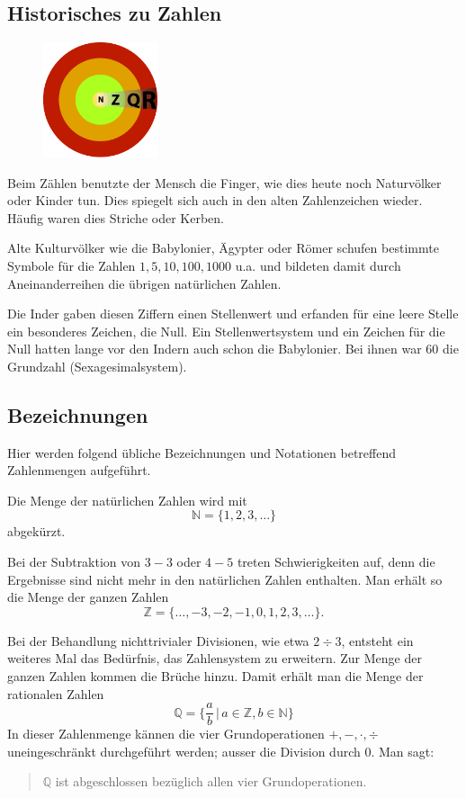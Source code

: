 \documentclass[%
11pt,%
twoside,%
titlepage,%
swissgerman,%
headsepline%
]{scrartcl}
\newcommand{\definition}[1]{\colorbox{emerald}{#1}}
\theoremstyle{definition}
\theoremstyle{plain}
\begin{document}
\subsection{Historisches zu Zahlen}

\begin{figure}
  \begin{center}
    \includegraphics[width=0.3\textwidth]{pictures/zahlen}
  \end{center}
\end{figure}
Beim Zählen benutzte der Mensch die Finger, wie dies heute noch Naturvölker oder Kinder tun. Dies spiegelt sich auch in den alten Zahlenzeichen wieder. Häufig waren dies Striche oder Kerben.

Alte Kulturvölker wie die Babylonier, Ägypter oder Römer schufen bestimmte Symbole für die Zahlen $1,5,10,100,1000$ u.a. und bildeten damit durch Aneinanderreihen die übrigen natürlichen Zahlen.

Die Inder gaben diesen Ziffern einen Stellenwert und erfanden für eine leere Stelle ein besonderes Zeichen, die Null. Ein Stellenwertsystem und ein Zeichen für die Null hatten lange vor den Indern auch schon die Babylonier. Bei ihnen war $60$ die Grundzahl (Sexagesimalsystem).

\subsection{Bezeichnungen}

Hier werden folgend übliche Bezeichnungen und Notationen betreffend Zahlenmengen aufgeführt.

Die Menge der \definition{natürlichen Zahlen} wird mit
$$\mathbb{N}=\{1,2,3,\dots\}$$
abgekürzt.

Bei der Subtraktion von $3-3$ oder $4-5$ treten Schwierigkeiten auf, denn die Ergebnisse sind nicht mehr in den natürlichen Zahlen enthalten. Man erhält so die Menge der \definition{ganzen Zahlen}
$$\mathbb{Z}=\{\dots,-3,-2,-1,0,1,2,3,\dots\}.$$

Bei der Behandlung nichttrivialer Divisionen, wie etwa $2\div3$, entsteht ein weiteres Mal das Bedürfnis, das Zahlensystem zu erweitern. Zur Menge der ganzen Zahlen kommen die Brüche hinzu. Damit erhält man die Menge der \definition{rationalen Zahlen}
$$\mathbb{Q}=\{\frac{a}{b}\,|\,a\in\mathbb{Z}, b\in\mathbb{N}\}$$
In dieser Zahlenmenge kännen die vier Grundoperationen $+,-,\cdot,\div$ uneingeschränkt durchgeführt werden; ausser die Division durch $0$. Man sagt:
\begin{quote}
$\mathbb{Q}$ ist \definition{abgeschlossen} bezüglich allen vier Grundoperationen.
\end{quote}
\end{document}
